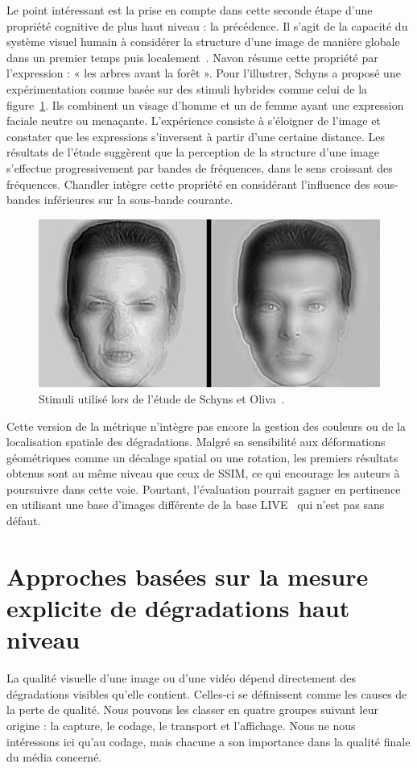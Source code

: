 Le point intéressant est la prise en compte dans cette seconde étape d'une propriété cognitive de plus haut niveau : la précédence. Il s'agit de la capacité du système visuel humain à considérer la structure d'une image de manière globale dans un premier temps puis localement~\cite{navon-cp1977, schyns-c1999}. Navon résume cette propriété par l'expression : « les arbres avant la forêt ». Pour l'illustrer, Schyns a proposé une expérimentation connue basée sur des stimuli hybrides comme celui de la figure~\ref{fig:angrysmile}. Ils combinent un visage d'homme et un de femme ayant une expression faciale neutre ou menaçante. L'expérience consiste à s'éloigner de l'image et constater que les expressions s'inversent à partir d'une certaine distance. Les résultats de l’étude suggèrent que la perception de la structure d'une image s'effectue progressivement par bandes de fréquences, dans le sens croissant des fréquences. Chandler intègre cette propriété en considérant l'influence des sous-bandes inférieures sur la sous-bande courante.

\begin{figure}[htbp]
	\centering
	\includegraphics[width=0.96\linewidth]{img/chap4/angrysmile}
	\caption{Stimuli utilisé lors de l'étude de Schyns et Oliva~\cite{schyns-c1999}.}
	\label{fig:angrysmile}
\end{figure}

Cette version de la métrique n'intègre pas encore la gestion des couleurs ou de la localisation spatiale des dégradations. Malgré sa sensibilité aux déformations géométriques comme un décalage spatial ou une rotation, les premiers résultats obtenus sont au même niveau que ceux de SSIM, ce qui encourage les auteurs à poursuivre dans cette voie. Pourtant, l'évaluation pourrait gagner en pertinence en utilisant une base d'images différente de la base LIVE~\cite{sheikh-live} qui n'est pas sans défaut.


\section{Approches basées sur la mesure explicite de dégradations haut niveau}
La qualité visuelle d'une image ou d'une vidéo dépend directement des dégradations visibles qu'elle contient. Celles-ci se définissent comme les causes de la perte de qualité. Nous pouvons les classer en quatre groupes suivant leur origine : la capture, le codage, le transport et l'affichage. Nous ne nous intéressons ici qu'au codage, mais chacune a son importance dans la qualité finale du média concerné.

